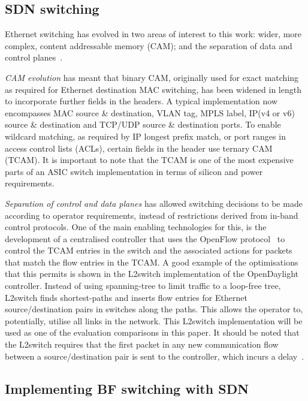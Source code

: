 \documentclass[conference]{IEEEtran}
\begin{document}
\subsection{SDN switching}
\label{sec:sdn-switching}

Ethernet switching has evolved in two areas of interest to this work: wider, more complex, content addressable memory (CAM); and the separation of data and control planes~\cite{Kreutz2015}.

\emph{CAM evolution} has meant that binary CAM, originally used for exact matching as required for Ethernet destination MAC switching, has been widened in length to incorporate further fields in the headers. A typical implementation now encompasses MAC source \& destination, VLAN tag, MPLS label, IP(v4 or v6) source \& destination and TCP/UDP source \& destination ports. To enable wildcard matching, as required by IP longest prefix match, or port ranges in access control lists (ACLs), certain fields in the header use ternary CAM (TCAM). It is important to note that the TCAM is one of the most expensive parts of an ASIC switch implementation in terms of silicon and power requirements.

\emph{Separation of control and data planes} has allowed switching decisions to be made according to operator requirements, instead of restrictions derived from in-band control protocols. One of the main enabling technologies for this, is the development of a centralised controller that uses the OpenFlow protocol~\cite{OpenFlow1.2} to control the TCAM entries in the switch and the associated actions for packets that match the flow entries in the TCAM. A good example of the optimisations that this permits is shown in the L2switch implementation of the OpenDaylight controller\cite{OpenDaylight}. Instead of using spanning-tree to limit traffic to a loop-free tree, L2switch finds shortest-paths and inserts flow entries for Ethernet source/destination pairs in switches along the paths. This allows the operator to, potentially, utilise all links in the network. This L2switch implementation will be used as one of the evaluation comparisons in this paper. It should be noted that the L2switch requires that the first packet in any new communication flow between a source/destination pair is sent to the controller, which incurs a delay~\cite{Kreutz2015}.

\subsection{Implementing BF switching with SDN}
\label{sec:bf-sdn}
\end{document}
